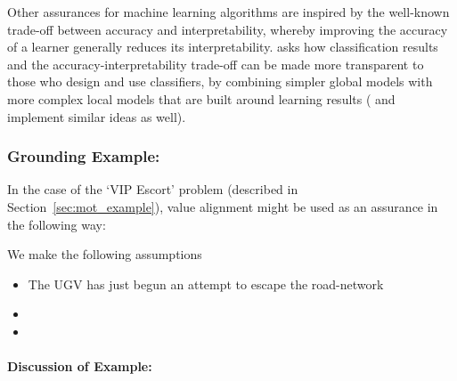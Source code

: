 Other assurances for machine learning algorithms are inspired by the well-known trade-off between accuracy and interpretability, whereby improving the accuracy of a learner generally reduces its interpretability. \citet{Ruping2006-xj} asks how classification results and the accuracy-interpretability trade-off can be made more transparent to those who design and use classifiers, by combining simpler global models with more complex local models that are built around learning results (\citet{Otte2013-oo} and \citet{Ribeiro2016-uc} implement similar ideas as well). 

\subsubsection{Grounding Example:}
In the case of the `VIP Escort' problem (described in Section~\ref{sec:mot_example}), value alignment might be used as an assurance in the following way:

We make the following assumptions

\begin{itemize}
    \item The UGV has just begun an attempt to escape the road-network
    \item 
    \item 
\end{itemize}

\paragraph{\textbf{Discussion of Example:}} 
